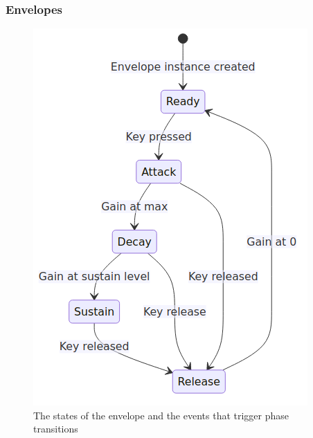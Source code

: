 \documentclass[acmlarge,screen]{acmart}
\begin{document}

	
	\subsubsection{Envelopes}
	
	\begin{figure}
		\centering
		\caption{The states of the envelope and the events that trigger phase transitions}
		\includegraphics[width=.8\linewidth]{envelope_state_diagram}
	\end{figure}
	
\end{document}
